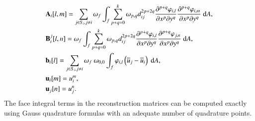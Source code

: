 {\begin{equation}
    \label{eq:vrCoeffs}
    \begin{aligned}
         & \mathbf{A}_{i} [l,m]= \sum_{j \in S_i, j \neq i} \omega_{f} 
           \int_{f}{
             \sum_{p+q=0}^{k} \omega_{p,q} d^{2p+2q}_{ij}
            \partialderivative{^{p+q}\varphi_{i,l}}{x^p\partial y^q}
            \partialderivative{^{p+q}\varphi_{i,m}}{x^p\partial y^q}
            \ \dd A},
        \\
         & \mathbf{B}^j_{i} [l,n]=
        \omega_f \int_{f}{
            \sum_{p+q=0}^{k}
            \omega_{p,q} d^{2p+2q}_{ij}
            \partialderivative{^{p+q}\varphi_{i,l}}{x^p\partial y^q}
            \partialderivative{^{p+q}\varphi_{j,n}}{x^p\partial y^q}
            \ \dd A},
        \\
         & \mathbf{b}_{i} [l]=
        \sum_{j \in S_i, j \neq i}
        \omega_f \ \omega_{0,0}
        \int_{f}{
            \varphi_{i,l} \left(\overline{u}_j - \overline{u}_i\right)
            \ \dd A},
        \\
         & \mathbf{u}_i [m]= u^m_i, \\
             & \mathbf{u}_j [n]= u^n_j.
    \end{aligned}
\end{equation}
The face integral terms in the reconstruction matrices can be computed exactly using Gauss quadrature formulas with an adequate number of quadrature points.}
